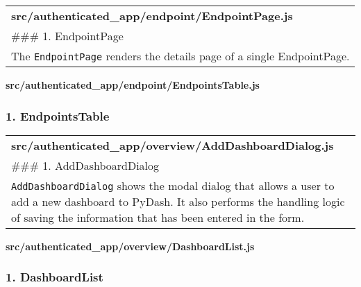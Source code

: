 \begin{longtable}[]{@{}l@{}}
\toprule
\endhead
\begin{minipage}[t]{0.08\columnwidth}\raggedright
\textbf{src/authenticated\_app/endpoint/EndpointPage.js}\strut
\end{minipage}\tabularnewline
\begin{minipage}[t]{0.08\columnwidth}\raggedright
\#\#\# 1. EndpointPage\strut
\end{minipage}\tabularnewline
\begin{minipage}[t]{0.08\columnwidth}\raggedright
The \texttt{EndpointPage} renders the details page of a single
EndpointPage.\strut
\end{minipage}\tabularnewline
\bottomrule
\end{longtable}

\textbf{src/authenticated\_app/endpoint/EndpointsTable.js}

\hypertarget{endpointstable}{%
\subsubsection{1. EndpointsTable}\label{endpointstable}}

\begin{longtable}[]{@{}l@{}}
\toprule
\endhead
\begin{minipage}[t]{0.08\columnwidth}\raggedright
\textbf{src/authenticated\_app/overview/AddDashboardDialog.js}\strut
\end{minipage}\tabularnewline
\begin{minipage}[t]{0.08\columnwidth}\raggedright
\#\#\# 1. AddDashboardDialog\strut
\end{minipage}\tabularnewline
\begin{minipage}[t]{0.08\columnwidth}\raggedright
\texttt{AddDashboardDialog} shows the modal dialog that allows a user to
add a new dashboard to PyDash. It also performs the handling logic of
saving the information that has been entered in the form.\strut
\end{minipage}\tabularnewline
\bottomrule
\end{longtable}

\textbf{src/authenticated\_app/overview/DashboardList.js}

\hypertarget{dashboardlist}{%
\subsubsection{1. DashboardList}\label{dashboardlist}}

